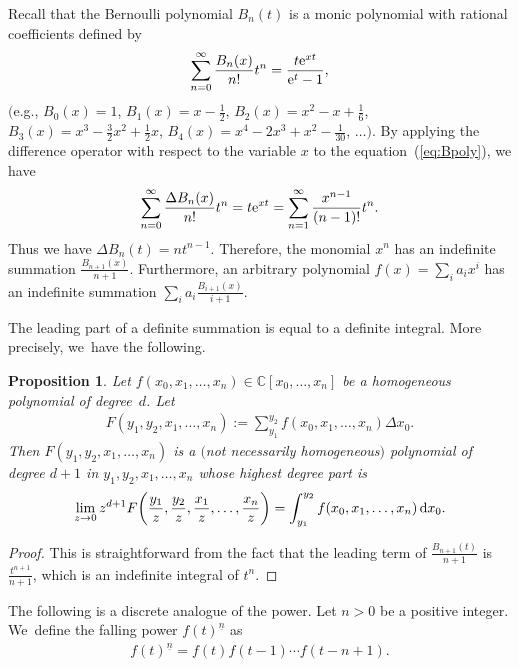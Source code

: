 \documentclass[pdftex]{sigma}
\numberwithin{equation}{section}
\newtheorem{Proposition}[Theorem]{Proposition}
{ \theoremstyle{definition}
\newtheorem{Definition}[Theorem]{Definition}
\newtheorem{Example}[Theorem]{Example}
\newtheorem{Remark}[Theorem]{Remark} }
\newcommand{\C}{\mathbb{C}}
\newcommand{\sint}{\sum\nolimits}
\begin{document}
\begin{Example}
Recall that the Bernoulli polynomial $B_n(t)$ is a monic polynomial
with rational coefficients defined by
\begin{gather}
\label{eq:Bpoly}
\sum_{n=0}^\infty
\frac{B_n(x)}{n !}t^n
=\frac{t{\rm e}^{xt}}{{\rm e}^t-1},
\end{gather}
$\big($e.g., $B_0(x)=1$, $B_1(x)=x-\frac{1}{2}$, $B_2(x)=x^2-x+\frac{1}{6}$,
$B_3(x)=x^3-\frac{3}{2}x^2+\frac{1}{2}x$,
$B_4(x)=x^4-2x^3+x^2-\frac{1}{30}$, $\ldots\big)$.
By applying the difference operator with respect to the variable $x$ to
the equation~(\ref{eq:Bpoly}), we have
\begin{gather*}
\sum_{n=0}^\infty
\frac{\Delta B_n(x)}{n !}t^n
=t{\rm e}^{xt}=\sum_{n=1}^\infty\frac{x^{n-1}}{(n-1)!}t^n.
\end{gather*}
Thus we have $\Delta B_n(t)=nt^{n-1}$.
Therefore, the monomial $x^n$ has an indefinite summation $\frac{B_{n+1}(x)}{n+1}$.
Furthermore, an arbitrary polynomial $f(x)=\sum_i a_ix^i$ has an indefinite summation
$\sum_ia_i\frac{B_{i+1}(x)}{i+1}$.
\end{Example}
The leading part of a definite summation is equal to a definite integral.
More precisely, we~have the following.

\begin{Proposition}\label{prop:leading}
Let $f(x_0, x_1, \dots, x_n)\in\C[x_0, \dots, x_n]$ be a homogeneous
polynomial of deg\-ree~$d$. Let
\begin{gather*}
F(y_1, y_2, x_1, \dots, x_n):=
\sint_{y_1}^{y_2}f(x_0, x_1, \dots, x_n)\Delta x_0.
\end{gather*}
Then $F(y_1, y_2, x_1, \dots, x_n)$ is a $($not necessarily homogeneous$)$
polynomial of degree $d+1$ in $y_1, y_2, x_1, \dots, x_n$
whose highest degree part is
\begin{gather*}
\lim_{z\to 0} z^{d+1}F\bigg(\frac{y_1}{z},\frac{y_2}{z},\frac{x_1}{z}, \dots,\frac{x_n}{z}\bigg)
=\int_{y_1}^{y_2}f(x_0, x_1, \dots, x_n)\, {\rm d} x_0.
\end{gather*}
\end{Proposition}

\begin{proof}
This is straightforward from the fact that the leading term of
$\frac{B_{n+1}(t)}{n+1}$ is $\frac{t^{n+1}}{n+1}$,
which is an indefinite integral of $t^n$.
\end{proof}

The following is a discrete analogue of the power.
Let $n>0$ be a positive integer. We~define the falling power
$f(t)^{\underline{n}}$ as
\begin{gather*}
f(t)^{\underline{n}}=f(t)f(t-1)\cdots f(t-n+1).
\end{gather*}
\end{document}
